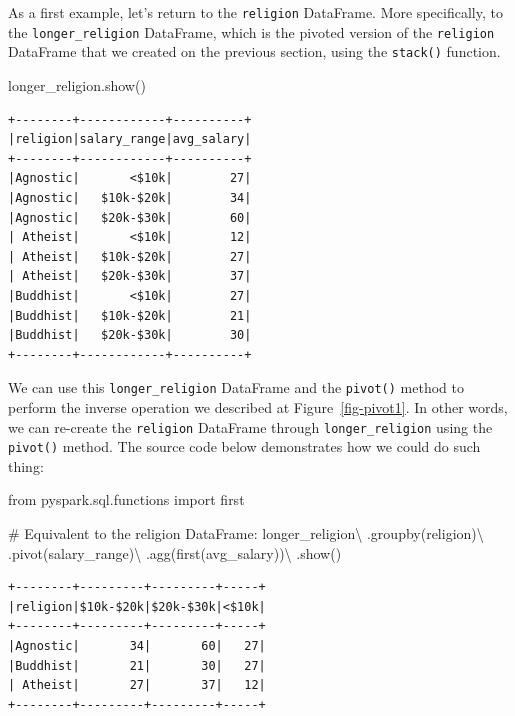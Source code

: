\documentclass[
  11pt,
  letterpaper,
  DIV=11,
  numbers=noendperiod]{scrreprt}
\newenvironment{Shaded}{\begin{snugshade}}{\end{snugshade}}
\newcommand{\CommentTok}[1]{\textcolor[rgb]{0.37,0.37,0.37}{#1}}
\newcommand{\ImportTok}[1]{\textcolor[rgb]{0.00,0.46,0.62}{#1}}
\newcommand{\NormalTok}[1]{\textcolor[rgb]{0.00,0.23,0.31}{#1}}
\newcommand{\OperatorTok}[1]{\textcolor[rgb]{0.37,0.37,0.37}{#1}}
\newcommand{\StringTok}[1]{\textcolor[rgb]{0.13,0.47,0.30}{#1}}
\begin{document}
As a first example, let's return to the \texttt{religion} DataFrame.
More specifically, to the \texttt{longer\_religion} DataFrame, which is
the pivoted version of the \texttt{religion} DataFrame that we created
on the previous section, using the \texttt{stack()} function.

\begin{Shaded}
\begin{Highlighting}[]
\NormalTok{longer\_religion.show()}
\end{Highlighting}
\end{Shaded}

\begin{verbatim}
+--------+------------+----------+
|religion|salary_range|avg_salary|
+--------+------------+----------+
|Agnostic|       <$10k|        27|
|Agnostic|   $10k-$20k|        34|
|Agnostic|   $20k-$30k|        60|
| Atheist|       <$10k|        12|
| Atheist|   $10k-$20k|        27|
| Atheist|   $20k-$30k|        37|
|Buddhist|       <$10k|        27|
|Buddhist|   $10k-$20k|        21|
|Buddhist|   $20k-$30k|        30|
+--------+------------+----------+
\end{verbatim}

We can use this \texttt{longer\_religion} DataFrame and the
\texttt{pivot()} method to perform the inverse operation we described at
Figure~\ref{fig-pivot1}. In other words, we can re-create the
\texttt{religion} DataFrame through \texttt{longer\_religion} using the
\texttt{pivot()} method. The source code below demonstrates how we could
do such thing:

\begin{Shaded}
\begin{Highlighting}[]
\ImportTok{from}\NormalTok{ pyspark.sql.functions }\ImportTok{import}\NormalTok{ first}

\CommentTok{\# Equivalent to the \textasciigrave{}religion\textasciigrave{} DataFrame:}
\NormalTok{longer\_religion}\OperatorTok{\textbackslash{}}
\NormalTok{    .groupby(}\StringTok{\textquotesingle{}religion\textquotesingle{}}\NormalTok{)}\OperatorTok{\textbackslash{}}
\NormalTok{    .pivot(}\StringTok{\textquotesingle{}salary\_range\textquotesingle{}}\NormalTok{)}\OperatorTok{\textbackslash{}}
\NormalTok{    .agg(first(}\StringTok{\textquotesingle{}avg\_salary\textquotesingle{}}\NormalTok{))}\OperatorTok{\textbackslash{}}
\NormalTok{    .show()}
\end{Highlighting}
\end{Shaded}

\begin{verbatim}
+--------+---------+---------+-----+
|religion|$10k-$20k|$20k-$30k|<$10k|
+--------+---------+---------+-----+
|Agnostic|       34|       60|   27|
|Buddhist|       21|       30|   27|
| Atheist|       27|       37|   12|
+--------+---------+---------+-----+
\end{verbatim}
\end{document}

